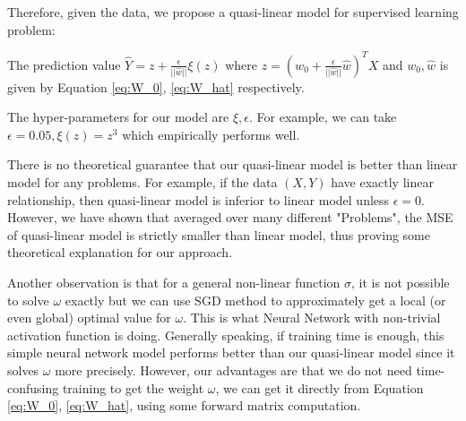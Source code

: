 \documentclass{article}
\begin{document}
Therefore, given the data, we propose a quasi-linear model for supervised learning problem:

The prediction value $\hat{Y} = z + \frac{\epsilon}{||\hat{w}||} \xi(z) $ where $z = (w_0 + \frac{\epsilon}{||\hat{w}||} \hat{w})^T X$ and $w_0, \hat{w}$ is given by
Equation \eqref{eq:W_0}, \eqref{eq:W_hat} respectively.

The hyper-parameters for our model are $\xi, \epsilon$. For example, we can take $\epsilon = 0.05, \xi(z) = z^3$ which empirically performs well.

There is no theoretical guarantee that our quasi-linear model is better than linear model for any problems. For example, if the data $(X,Y)$ have exactly
linear relationship, then quasi-linear model is inferior to linear model unless $\epsilon = 0$. However, we have shown that averaged over many different "Problems",
the MSE of quasi-linear model is strictly smaller than linear model, thus proving some theoretical explanation for our approach.

Another observation is that for a general non-linear function $\sigma$, it is not possible to solve $\omega$ exactly but we can use SGD method
to approximately get a local (or even global) optimal value for $\omega$. This is what Neural Network with non-trivial activation function is doing.
Generally speaking, if training time is enough, this simple neural network model performs better than our quasi-linear model since it solves $\omega$ more precisely.
However, our advantages are that we do not need time-confusing training to get the weight $\omega$, we can get it directly from Equation \eqref{eq:W_0}, \eqref{eq:W_hat}, using some forward matrix computation.
\end{document}
